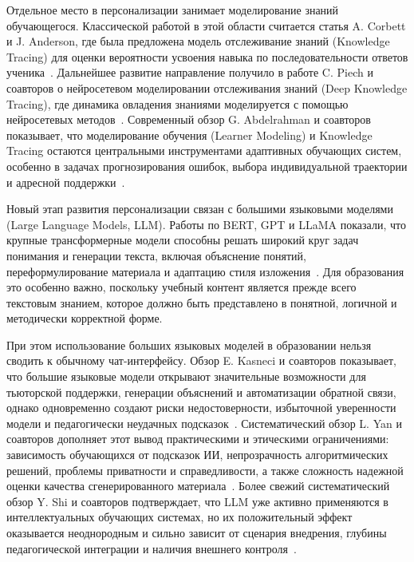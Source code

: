 \documentclass[a4paper,12pt]{extarticle}
\begin{document}
Отдельное место в персонализации занимает моделирование знаний обучающегося. Классической работой в 
этой области считается статья A. Corbett и J. Anderson, где была предложена модель отслеживание знаний (Knowledge Tracing)
для оценки вероятности усвоения навыка по последовательности ответов ученика~\cite{corbett1994kt}. 
Дальнейшее развитие направление получило в работе C. Piech и соавторов о нейросетевом моделировании отслеживания знаний 
(Deep Knowledge Tracing), 
где динамика овладения знаниями моделируется с помощью нейросетевых методов~\cite{piech2015dkt}. 
Современный обзор G. Abdelrahman и соавторов показывает, что моделирование обучения (Learner Modeling) и Knowledge Tracing остаются 
центральными инструментами адаптивных обучающих систем, особенно в задачах прогнозирования ошибок, 
выбора индивидуальной траектории и адресной поддержки~\cite{abdelrahman2023ktsurvey}.

Новый этап развития персонализации связан с большими языковыми моделями (Large Language Models, LLM). 
Работы по BERT, GPT и LLaMA показали, 
что крупные трансформерные модели способны решать широкий круг задач понимания и генерации текста, 
включая объяснение понятий, переформулирование материала и адаптацию стиля 
изложения~\cite{devlin2019bert,brown2020gpt3,touvron2023llama}. 
Для образования это особенно важно, поскольку учебный контент является прежде всего текстовым знанием, 
которое должно быть представлено в понятной, логичной и методически корректной форме.

При этом использование больших языковых моделей в образовании нельзя сводить к 
обычному чат-интерфейсу. Обзор E. Kasneci и 
соавторов показывает, что большие языковые модели открывают значительные возможности для тьюторской поддержки, 
генерации объяснений и автоматизации обратной связи, однако одновременно создают риски недостоверности, 
избыточной уверенности модели и педагогически неудачных подсказок~\cite{kasneci2023chatgpt}. 
Систематический обзор L. Yan и соавторов дополняет этот вывод практическими и этическими ограничениями: 
зависимость обучающихся от подсказок ИИ, непрозрачность алгоритмических решений, проблемы приватности и 
справедливости, а также сложность надежной оценки качества сгенерированного материала~\cite{yan2024challenges}. 
Более свежий систематический обзор Y. Shi и соавторов подтверждает, что LLM уже активно применяются 
в интеллектуальных обучающих системах, но их положительный эффект оказывается неоднородным и сильно зависит от 
сценария внедрения, глубины педагогической интеграции и наличия внешнего контроля~\cite{shi2025llmedu}.
\end{document}
